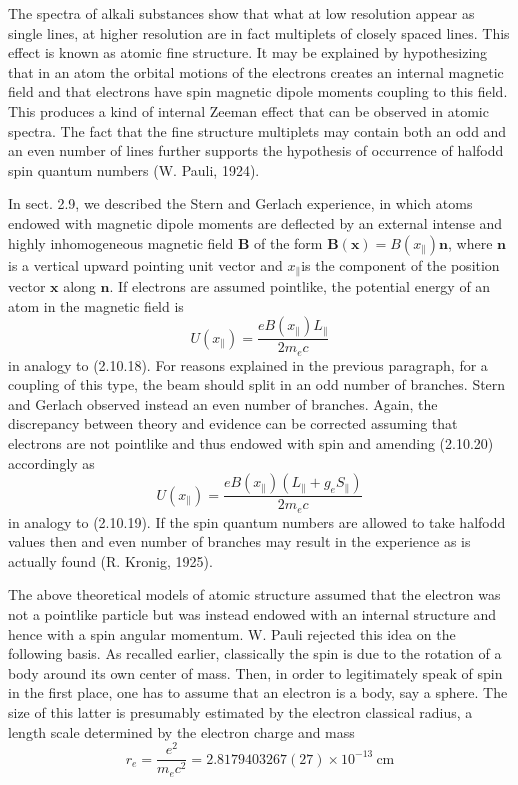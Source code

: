\documentclass{article}
\begin{document}
The spectra of alkali substances show that what at low resolution appear as single lines, at higher resolution are in fact multiplets of closely spaced lines. This effect is known as atomic fine structure. It may be explained by hypothesizing that in an atom the orbital motions of the electrons creates an internal magnetic field and that electrons have spin magnetic dipole moments coupling to this field. This produces a kind of internal Zeeman effect that can be observed in atomic spectra. The fact that the fine structure multiplets may contain both an odd and an even number of lines further supports the hypothesis of occurrence of halfodd spin quantum numbers (W. Pauli, 1924).

In sect. 2.9, we described the Stern and Gerlach experience, in which atoms endowed with magnetic dipole moments are deflected by an external intense and highly inhomogeneous magnetic field $\boldsymbol{B}$ of the form $\boldsymbol{B}(\boldsymbol{x})=B\left(x_{\|}\right) \boldsymbol{n}$, where $\boldsymbol{n}$ is a vertical upward pointing unit vector and $x_{\|}$is the component of the position vector $\boldsymbol{x}$ along $\boldsymbol{n}$. If electrons are assumed pointlike, the potential energy of an atom in the magnetic field is
$$
\begin{equation*}
U\left(x_{\|}\right)=\frac{e B\left(x_{\|}\right) L_{\|}}{2 m_{e} c} \tag{2.10.20}
\end{equation*}
$$
in analogy to (2.10.18). For reasons explained in the previous paragraph, for a
coupling of this type, the beam should split in an odd number of branches. Stern and Gerlach observed instead an even number of branches. Again, the discrepancy between theory and evidence can be corrected assuming that electrons are not pointlike and thus endowed with spin and amending (2.10.20) accordingly as
$$
\begin{equation*}
U\left(x_{\|}\right)=\frac{e B\left(x_{\|}\right)\left(L_{\|}+g_{e} S_{\|}\right)}{2 m_{e} c} \tag{2.10.21}
\end{equation*}
$$
in analogy to (2.10.19). If the spin quantum numbers are allowed to take halfodd values then and even number of branches may result in the experience as is actually found (R. Kronig, 1925).

The above theoretical models of atomic structure assumed that the electron was not a pointlike particle but was instead endowed with an internal structure and hence with a spin angular momentum. W. Pauli rejected this idea on the following basis. As recalled earlier, classically the spin is due to the rotation of a body around its own center of mass. Then, in order to legitimately speak of spin in the first place, one has to assume that an electron is a body, say a sphere. The size of this latter is presumably estimated by the electron classical radius, a length scale determined by the electron charge and mass
$$
\begin{equation*}
r_{e}=\frac{e^{2}}{m_{e} c^{2}}=2.8179403267(27) \times 10^{-13} \mathrm{~cm} \tag{2.10.22}
\end{equation*}
$$
\end{document}
